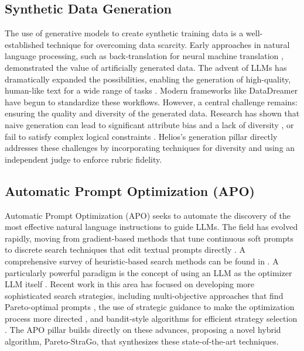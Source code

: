 \documentclass{article}
\begin{document}
\subsection{Synthetic Data Generation}
The use of generative models to create synthetic training data is a well-established technique for overcoming data scarcity. Early approaches in natural language processing, such as back-translation for neural machine translation \citep{sennrich2016improvingneuralmachinetranslation}, demonstrated the value of artificially generated data. The advent of LLMs has dramatically expanded the possibilities, enabling the generation of high-quality, human-like text for a wide range of tasks \citep{nadas2025syntheticdatagenerationusing}. Modern frameworks like DataDreamer \citep{patel2024datadreamertoolsyntheticdata} have begun to standardize these workflows. However, a central challenge remains: ensuring the quality and diversity of the generated data. Research has shown that naive generation can lead to significant attribute bias and a lack of diversity \citep{yu2023largelanguagemodelattributed}, or fail to satisfy complex logical constraints \citep{fedoseev2024constraint}. Helios's generation pillar directly addresses these challenges by incorporating techniques for diversity \citep{kowshik2024corrsynthcorrelatedsampling} and using an independent judge to enforce rubric fidelity.

\subsection{Automatic Prompt Optimization (APO)}
Automatic Prompt Optimization (APO) seeks to automate the discovery of the most effective natural language instructions to guide LLMs. The field has evolved rapidly, moving from gradient-based methods that tune continuous soft prompts \citep{lester2021powerscaleparameterefficientprompt} to discrete search techniques that edit textual prompts directly \citep{pryzant2023automaticpromptoptimizationgradient}. A comprehensive survey of heuristic-based search methods can be found in \citep{cui2025automaticpromptoptimizationheuristic}. A particularly powerful paradigm is the concept of using an LLM as the optimizer LLM itself \citep{yang2024largelanguagemodelsoptimizers}. Recent work in this area has focused on developing more sophisticated search strategies, including multi-objective approaches that find Pareto-optimal prompts \citep{zhao2025pareto}, the use of strategic guidance to make the optimization process more directed \citep{wu2024stragoharnessingstrategicguidance}, and bandit-style algorithms for efficient strategy selection \citep{ashizawa2025banditbasedpromptdesignstrategy}. The APO pillar builds directly on these advances, proposing a novel hybrid algorithm, Pareto-StraGo, that synthesizes these state-of-the-art techniques.
\end{document}
